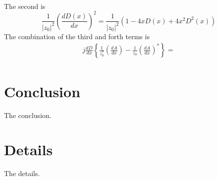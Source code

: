 \documentclass[amsmath,amssymb,aps,prd,10pt,twocolumn,showkeys]{revtex4}
\begin{document}
\begin{itemize}
\begin{multline}
\end{multline}
The second is
\begin{equation}
\frac{1}{|z_0|^2}\left(\frac{dD(x)}{dx}\right)^2 = \frac{1}{|z_0|^2}\left(1-4xD(x)+4x^2D^2(x) \right)
\end{equation}
The combination of the third and forth terms is
\begin{multline}
j\frac{dD}{dx}\left\lbrace \frac{1}{z_0^{*}} \left(\frac{dA}{dx}\right) - \frac{1}{z_0} \left(\frac{dA}{dx}\right)^{*}\right\rbrace = \\
\end{multline}
\end{itemize}

\section{Conclusion}
\label{sec:conc}

The conclusion.

\appendix

\section{Details}
\label{app:a}

The details.


\end{document}
